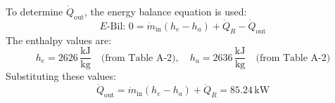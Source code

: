 To determine \( \dot{Q}_{\text{out}} \), the energy balance equation is used:  
\[
E\text{-Bil: } 0 = \dot{m}_{\text{in}} (h_e - h_a) + \dot{Q}_R - \dot{Q}_{\text{out}}
\]  
The enthalpy values are:  
\[
h_e = 2626 \, \frac{\text{kJ}}{\text{kg}} \quad \text{(from Table A-2)}, \quad h_a = 2636 \, \frac{\text{kJ}}{\text{kg}} \quad \text{(from Table A-2)}
\]  
Substituting these values:  
\[
\dot{Q}_{\text{out}} = \dot{m}_{\text{in}} (h_e - h_a) + \dot{Q}_R = 85.24 \, \text{kW}
\]